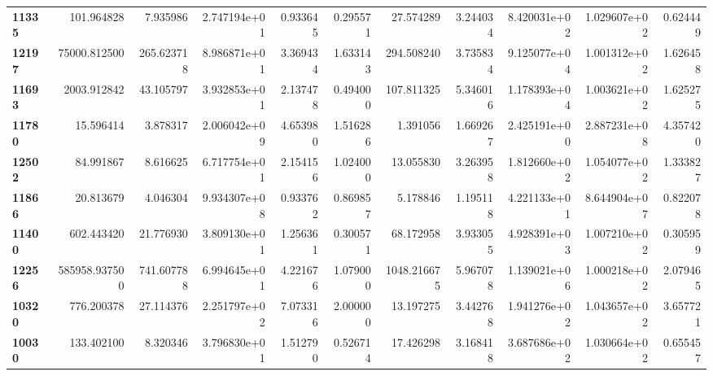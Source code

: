 \begin{table}[h]
\begin{tabular}{lrrrrrrrrrr}
\textbf{11335} &     101.964828 &        7.935986 &               2.747194e+01 &  0.933645 &  0.295571 &    27.574289 &   3.244034 &  8.420031e+02 &  1.029607e+02 &     0.624449 \\
\textbf{12197} &   75000.812500 &      265.623718 &               8.986871e+01 &  3.369434 &  1.633143 &   294.508240 &   3.735834 &  9.125077e+04 &  1.001312e+02 &     1.626458 \\
\textbf{11693} &    2003.912842 &       43.105797 &               3.932853e+01 &  2.137478 &  0.494000 &   107.811325 &   5.346016 &  1.178393e+04 &  1.003621e+02 &     1.625275 \\
\textbf{11780} &      15.596414 &        3.878317 &               2.006042e+09 &  4.653980 &  1.516286 &     1.391056 &   1.669267 &  2.425191e+00 &  2.887231e+08 &     4.357420 \\
\textbf{12502} &      84.991867 &        8.616625 &               6.717754e+01 &  2.154156 &  1.024000 &    13.055830 &   3.263958 &  1.812660e+02 &  1.054077e+02 &     1.333827 \\
\textbf{11866} &      20.813679 &        4.046304 &               9.934307e+08 &  0.933762 &  0.869857 &     5.178846 &   1.195118 &  4.221133e+01 &  8.644904e+07 &     0.822078 \\
\textbf{11400} &     602.443420 &       21.776930 &               3.809130e+01 &  1.256361 &  0.300571 &    68.172958 &   3.933055 &  4.928391e+03 &  1.007210e+02 &     0.305959 \\
\textbf{12256} &  585958.937500 &      741.607788 &               6.994645e+01 &  4.221676 &  1.079000 &  1048.216675 &   5.967078 &  1.139021e+06 &  1.000218e+02 &     2.079465 \\
\textbf{10320} &     776.200378 &       27.114376 &               2.251797e+02 &  7.073316 &  2.000000 &    13.197275 &   3.442768 &  1.941276e+02 &  1.043657e+02 &     3.657721 \\
\textbf{10030} &     133.402100 &        8.320346 &               3.796830e+01 &  1.512790 &  0.526714 &    17.426298 &   3.168418 &  3.687686e+02 &  1.030664e+02 &     0.655457 \\
\bottomrule
\end{tabular}
\end{table}
